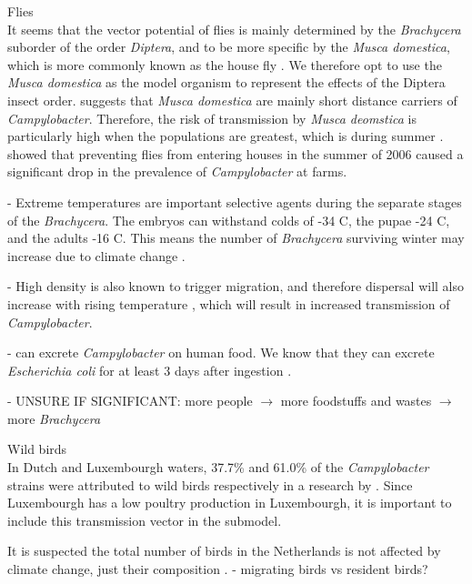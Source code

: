 \textcolor{AMAZINGPINK}{Flies} \\
It seems that the vector potential of flies is mainly determined by the \textit{Brachycera} suborder of the order \textit{Diptera}, and to be more specific by the \textit{Musca domestica}, which is more commonly known as the house fly \parencite{hald_influxed_2008}. We therefore opt to use the \textit{Musca domestica} as the model organism to represent the effects of the Diptera insect order. \cite{skovgard_retention_2011} suggests that \textit{Musca domestica} are mainly short distance carriers of \textit{Campylobacter}. Therefore, the risk of transmission by \textit{Musca deomstica} is particularly high when the populations are greatest, which is during summer \parencite{royden_role_2016}. \cite{hald_use_2007} showed that preventing flies from entering houses in the summer of 2006 caused a significant drop in the prevalence of \textit{Campylobacter} at farms.


- Extreme temperatures are important selective agents during the separate stages of the \textit{Brachycera}. The embryos can withstand colds of -34 \degree C, the pupae -24 \degree C, and the adults -16 \degree C.  This means the number of \textit{Brachycera} surviving winter may increase due to climate change \parencite{goulson_predicting_2005}.

- High density is also known to trigger migration, and therefore dispersal will also increase with rising temperature \parencite{feder_locomotion_2010}, which will result in increased transmission of \textit{Campylobacter}.

-  can excrete \textit{Campylobacter}  on human food. We know that they can excrete \textit{Escherichia coli} for at least 3 days after ingestion \parencite{sasaki_epidemiological_2000}.


- UNSURE IF SIGNIFICANT: more people $\to$ more foodstuffs and wastes \parencite{garcia-garcia_framework_2015} $\to$ more \textit{Brachycera} \parencite{imai_population_1984, rozendaal_houseflies_1997}

\textcolor{AMAZINGPINK}{Wild birds} \\
In Dutch and Luxembourgh waters, 37.7\% and 61.0\% of the \textit{Campylobacter} strains were attributed to wild birds respectively in a research by \cite{mughini-gras_quantifying_2016}. Since Luxembourgh has a low poultry production in Luxembourgh, it is important to include this transmission vector in the submodel.

It is suspected the total number of birds in the Netherlands is not affected by climate change, just their composition \parencite{mclean_reduced_2020, knudsen_challenging_2011}.
- migrating birds vs resident birds?

